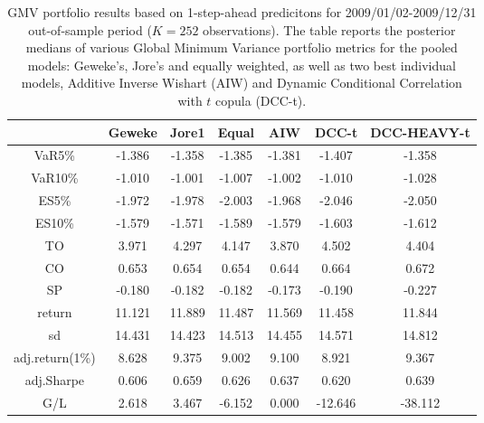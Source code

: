 \begin{table}[ht]
\centering
\caption{GMV portfolio results based on 1-step-ahead predicitons 
             for  2009/01/02-2009/12/31 out-of-sample period ($K=252$ observations).
             The table reports the posterior medians of various Global Minimum
             Variance portfolio metrics for the pooled models: 
             Geweke's, Jore's and equally weighted, 
             as well as two best individual models, Additive Inverse Wishart (AIW) and 
             Dynamic Conditional Correlation with $t$ copula (DCC-t).} 
\label{table:gmvfull}
\begin{tabular}{ccccccc}
  \hline
 & Geweke & Jore1 & Equal & AIW & DCC-t & DCC-HEAVY-t \\ 
  \hline
VaR5\% & -1.386 & -1.358 & -1.385 & -1.381 & -1.407 & -1.358 \\ 
  VaR10\% & -1.010 & -1.001 & -1.007 & -1.002 & -1.010 & -1.028 \\ 
  ES5\% & -1.972 & -1.978 & -2.003 & -1.968 & -2.046 & -2.050 \\ 
  ES10\% & -1.579 & -1.571 & -1.589 & -1.579 & -1.603 & -1.612 \\ 
  TO & 3.971 & 4.297 & 4.147 & 3.870 & 4.502 & 4.404 \\ 
  CO & 0.653 & 0.654 & 0.654 & 0.644 & 0.664 & 0.672 \\ 
  SP & -0.180 & -0.182 & -0.182 & -0.173 & -0.190 & -0.227 \\ 
   \hline
return & 11.121 & 11.889 & 11.487 & 11.569 & 11.458 & 11.844 \\ 
  sd & 14.431 & 14.423 & 14.513 & 14.455 & 14.571 & 14.812 \\ 
  adj.return(1\%) & 8.628 & 9.375 & 9.002 & 9.100 & 8.921 & 9.367 \\ 
  adj.Sharpe & 0.606 & 0.659 & 0.626 & 0.637 & 0.620 & 0.639 \\ 
  G/L & 2.618 & 3.467 & -6.152 & 0.000 & -12.646 & -38.112 \\ 
   \hline
\end{tabular}
\end{table}
